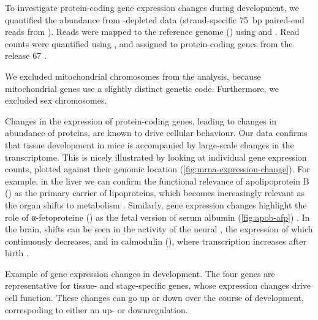 To investigate protein-coding gene expression changes during development, we
quantified the \mrna abundance from \rrna-depleted \rnaseq data (strand-specific
\SI{75}{bp} paired-end reads from  ). Reads were
mapped to the \mmu reference genome () using
 \citep{Fonseca:2014} and 
\citep{Kim:2013}. Read counts were quantified using 
\citep{Anders:2014}, and assigned to protein-coding genes from the
 release \num{67} \citep{Flicek:2014}.

We excluded mitochondrial chromosomes from the analysis, because mitochondrial
genes use a slightly distinct genetic code\todo[ref]{}. Furthermore, we excluded
sex chromosomes.

Changes in the expression of protein-coding genes, leading to changes in
abundance of proteins, are known to drive cellular behaviour\todo[ref]{}. Our
data confirms that tissue development in mice is accompanied by large-scale
changes in the \mrna transcriptome. This is nicely illustrated by looking at
individual gene expression counts, plotted against their genomic location
(\cref{fig:mrna-expression-change}). For example, in the liver we can confirm
the functional relevance of apolipoprotein B () as the
primary carrier of lipoproteins, which becomes increasingly relevant as the
organ shifts to metabolism \citep{Knott:1986}. Similarly, \mrna gene expression
changes highlight the role of α-fetoproteine () as the
fetal version of serum albumin (\cref{fig:apob-afp}) \citep{Chen:1997}. In the
brain, shifts can be seen in the activity of the neural \tf
{}, the expression of which continuously decreases, and in
calmodulin (), where transcription increases after birth
\citep{Tsui:2013,Huang:2011}.

    {Example of gene expression changes in development.}
    {The four genes are representative for tissue- and stage-specific genes,
    whose expression changes drive cell function. These changes can go up or
    down over the course of development, correspoding to either an up- or
    downregulation.}

